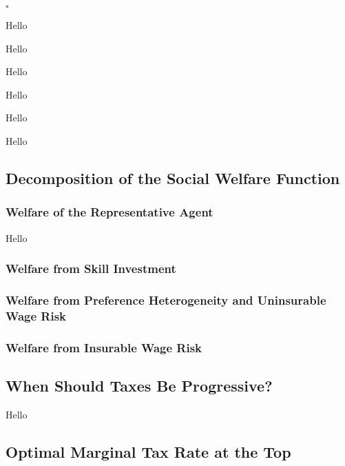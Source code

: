 \documentclass{article}
\newenvironment{customthm}[1]
  {\renewcommand\theinnercustomthm{#1}\innercustomthm}
  {\endinnercustomthm}
\begin{document}
$\square$

{
\corollary Hello

}

{
\corollary Hello

}

{
\corollary Hello

}

{
\corollary Hello

}

{
\corollary Hello

}

{
\corollary Hello

}

\subsection{Decomposition of the Social Welfare Function}

\subsubsection{Welfare of the Representative Agent}

\begin{customthm}{5}\label{prop5}
Hello
\end{customthm}

\subsubsection{Welfare from Skill Investment}

\subsubsection{Welfare from Preference Heterogeneity and Uninsurable Wage Risk}

\subsubsection{Welfare from Insurable Wage Risk}

\subsection{When Should Taxes Be Progressive?}

\begin{customthm}{6}\label{prop6}
Hello
\end{customthm}

\subsection{Optimal Marginal Tax Rate at the Top}
\end{document}
